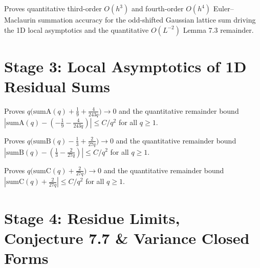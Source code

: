 \begin{theorem}
\label{thm:gauss-em}
\leanok
Proves quantitative third-order $O(h^3)$ and fourth-order $O(h^4)$ Euler--Maclaurin summation accuracy for the odd-shifted Gaussian lattice sum driving the 1D local asymptotics and the quantitative $O(L^{-2})$ Lemma 7.3 remainder.
\end{theorem}

\section{Stage 3: Local Asymptotics of 1D Residual Sums}

\begin{theorem}
\label{thm:sumA}
\leanok
Proves $q\bigl(\mathrm{sumA}(q) + \frac{1}{9} + \frac{4}{243q}\bigr) \to 0$ and the quantitative remainder bound $|\mathrm{sumA}(q) - (-\frac{1}{9} - \frac{4}{243q})| \le C/q^2$ for all $q \ge 1$.
\end{theorem}

\begin{theorem}
\label{thm:sumB}
\leanok
Proves $q\bigl(\mathrm{sumB}(q) - \frac{1}{3} + \frac{2}{27q}\bigr) \to 0$ and the quantitative remainder bound $|\mathrm{sumB}(q) - (\frac{1}{3} - \frac{2}{27q})| \le C/q^2$ for all $q \ge 1$.
\end{theorem}

\begin{theorem}
\label{thm:sumC}
\leanok
Proves $q\bigl(\mathrm{sumC}(q) + \frac{2}{27q}\bigr) \to 0$ and the quantitative remainder bound $|\mathrm{sumC}(q) + \frac{2}{27q}| \le C/q^2$ for all $q \ge 1$.
\end{theorem}

\section{Stage 4: Residue Limits, Conjecture 7.7 \& Variance Closed Forms}

